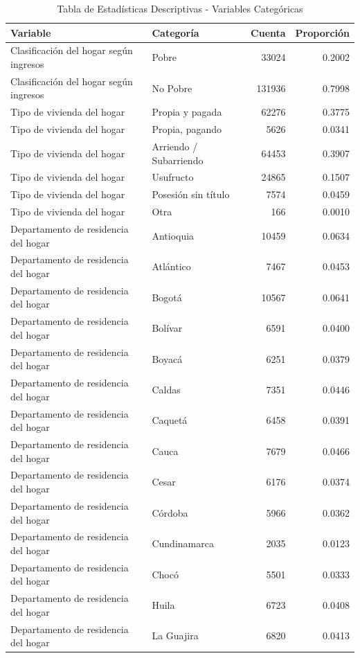 \begin{table}

\caption{Tabla de Estadísticas Descriptivas - Variables Categóricas}
\centering
\begin{tabular}[t]{llrr}
\toprule
Variable & Categoría & Cuenta & Proporción\\
\midrule
Clasificación del hogar según ingresos & Pobre & 33024 & 0.2002\\
Clasificación del hogar según ingresos & No Pobre & 131936 & 0.7998\\
Tipo de vivienda del hogar & Propia y pagada & 62276 & 0.3775\\
Tipo de vivienda del hogar & Propia, pagando & 5626 & 0.0341\\
Tipo de vivienda del hogar & Arriendo / Subarriendo & 64453 & 0.3907\\
\addlinespace
Tipo de vivienda del hogar & Usufructo & 24865 & 0.1507\\
Tipo de vivienda del hogar & Posesión sin título & 7574 & 0.0459\\
Tipo de vivienda del hogar & Otra & 166 & 0.0010\\
Departamento de residencia del hogar & Antioquia & 10459 & 0.0634\\
Departamento de residencia del hogar & Atlántico & 7467 & 0.0453\\
\addlinespace
Departamento de residencia del hogar & Bogotá & 10567 & 0.0641\\
Departamento de residencia del hogar & Bolívar & 6591 & 0.0400\\
Departamento de residencia del hogar & Boyacá & 6251 & 0.0379\\
Departamento de residencia del hogar & Caldas & 7351 & 0.0446\\
Departamento de residencia del hogar & Caquetá & 6458 & 0.0391\\
\addlinespace
Departamento de residencia del hogar & Cauca & 7679 & 0.0466\\
Departamento de residencia del hogar & Cesar & 6176 & 0.0374\\
Departamento de residencia del hogar & Córdoba & 5966 & 0.0362\\
Departamento de residencia del hogar & Cundinamarca & 2035 & 0.0123\\
Departamento de residencia del hogar & Chocó & 5501 & 0.0333\\
\addlinespace
Departamento de residencia del hogar & Huila & 6723 & 0.0408\\
Departamento de residencia del hogar & La Guajira & 6820 & 0.0413\\

\end{tabular}
\end{table}
